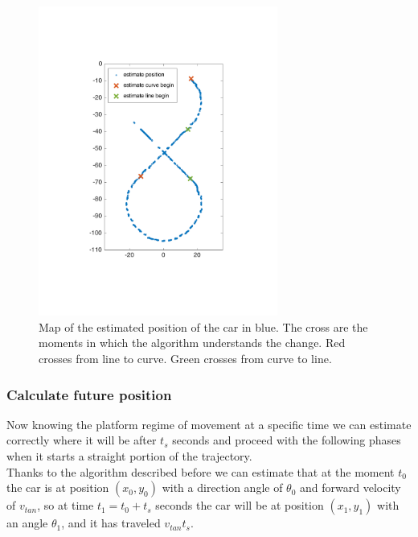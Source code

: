 \begin{figure}[!htbp]
    \centering
    \includegraphics[width=0.7\textwidth]{img/following_platform_for_long_map_simple.pdf}
    \caption{Map of the estimated position of the car in blue. The cross are the moments in which the algorithm understands the change. Red crosses from line to curve. Green crosses from curve to line.}
    \label{fig:error_regression_map}
\end{figure}


\subsubsection{Calculate future position}
Now knowing the platform regime of movement at a specific time we can estimate correctly where it will be after $t_s$ seconds and proceed with the following phases when it starts a straight portion of the trajectory.\\
Thanks to the algorithm described before we can estimate that at the moment $t_0$ the car is at position $(x_0,y_0)$ with a direction angle of $\theta_0$ and forward velocity of $v_{tan}$, so at time $t_1 = t_0 + t_s$ seconds the car will be at position $(x_1,y_1)$ with an angle  $\theta_1$, and it has traveled  $v_{tan}t_s$.

